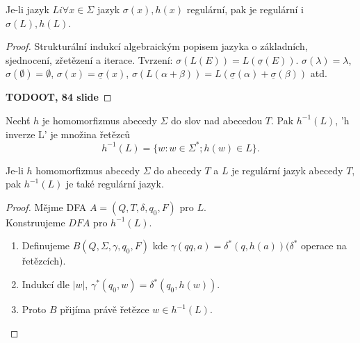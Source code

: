\documentclass[../main.tex]{subfiles}
\begin{document}
\begin{theorem}
    Je-li jazyk $L i \forall x \in \Sigma$ jazyk $\sigma(x),h(x)$ regulární, pak je regulární i $\sigma(L), h(L)$.
\end{theorem}
\begin{proof}
    Strukturální indukcí  algebraickým popisem jazyka o základních, sjednocení, zřetězení a iterace. Tvrzení:
    $\sigma(L(E)) = L(\underline{\sigma}(E)).$ $\sigma({\lambda}) = \lambda$, $\sigma(\emptyset) = \emptyset$,
    $\sigma({x}) = \underline{\sigma}(x)$, $\sigma(L(\alpha + \beta)) = L(\underline{\sigma}(\alpha) + \underline{\sigma}(\beta))$ atd.

    \textbf{TODOOT, 84 slide}
\end{proof}

\begin{definition}
    Nechť $h$ je homomorfizmus abecedy $\Sigma$ do slov nad abecedou $T$. Pak $h^{-1}(L)$, 'h inverze L' je množina řetězců
    \[h^{-1}(L) = \{w : w \in \Sigma^*; h(w) \in L\}.\]
\end{definition}

\begin{theorem}
    Je-li $h$ homomorfizmus abecedy $\Sigma$ do abecedy $T$ a $L$ je regulární jazyk abecedy $T$, pak $h^{-1}(L)$ je také regulární jazyk.
\end{theorem}
\begin{proof}
    Mějme DFA $A = (Q,T,\delta,q_0,F)$ pro $L$.\\
    Konstruujeme $DFA$ pro $h^{-1}(L)$.
    \begin{enumerate}
        \item Definujeme $B(Q,\Sigma, \gamma, q_0, F)$ kde $\gamma(qq,a) = \delta^*(q,h(a)) (\delta^*$ operace na řetězcích).
        \item Indukcí dle $|w|$, $\gamma^*(q_0,w) = \delta^*(q_0,h(w))$.
        \item Proto $B$ přijíma právě řetězce $w\in h^{-1}(L)$.
    \end{enumerate}
\end{proof}
\end{document}
